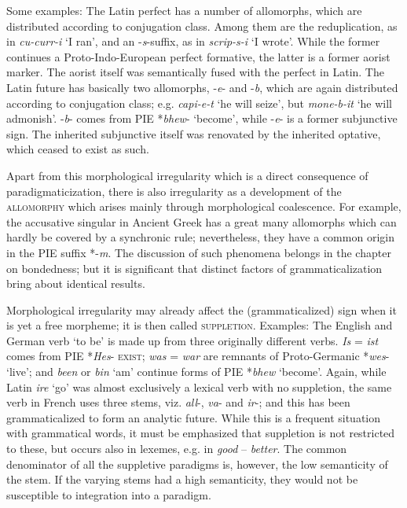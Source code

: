Some examples: The Latin perfect has a number of allomorphs, which are distributed according to conjugation class. Among them are the reduplication, as in \textit{cu-curr-i} ‘I ran’, and an -\textit{s}{}-suffix, as in \textit{scrip-s-i} ‘I wrote’. While the former continues a Proto-Indo-European perfect formative, the latter is a former aorist marker. The aorist itself was semantically fused with the perfect in Latin. The Latin future has basically two allomorphs, -\textit{e}{}- and -\textit{b}, which are again distributed according to conjugation class; e.g. \textit{capi-e-t} ‘he will seize’, but \textit{mone-b-it} ‘he will admonish’. -\textit{b}{}- comes from PIE *\textit{bhew}{}- ‘become’, while -\textit{e}{}- is a former subjunctive sign. The inherited subjunctive itself was renovated by the inherited optative, which ceased to exist as such.

Apart from this morphological irregularity which is a direct consequence of paradigmaticization, there is also irregularity as a development of the \textsc{allomorphy} which arises mainly through morphological coalescence. For example, the accusative singular in Ancient Greek has a great many allomorphs which can hardly be covered by a synchronic rule; nevertheless, they have a common origin in the PIE suffix *-\textit{m}. The discussion of such phenomena belongs in the chapter on bondedness; but it is significant that distinct factors of grammaticalization bring about identical results.

Morphological irregularity may already affect the (grammaticalized) sign when it is yet a free morpheme; it is then called \textsc{suppletion}. Examples: The English and German verb ‘to be’ is made up from three originally different verbs. \textit{Is} = \textit{ist} comes from PIE *\textit{Hes}{}- \textsc{exist}; \textit{was} = \textit{war} are remnants of Proto-Germanic *\textit{wes}{}- ‘live’; and \textit{been} or \textit{bin} ‘am’ continue forms of PIE *\textit{bhew} ‘become’. Again, while Latin \textit{ire} ‘go’ was almost exclusively a lexical verb with no suppletion, the same verb in French uses three stems, viz. \textit{all}{}-, \textit{va}{}- and \textit{ir}{}-; and this has been grammaticalized to form an analytic future. While this is a frequent situation with grammatical words, it must be emphasized that suppletion is not restricted to these, but occurs also in lexemes, e.g. in \textit{good} -- \textit{better}. The common denominator of all the suppletive paradigms is, however, the low semanticity of the stem. If the varying stems had a high semanticity, they would not be susceptible to integration into a paradigm.

